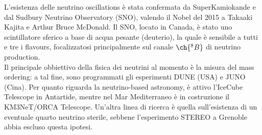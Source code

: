 L'esistenza delle neutrino oscillations è stata confermata da SuperKamiokande e dal Sudbury Neutrino Observatory (SNO), valendo il Nobel del 2015 a Takaaki Kajita e Arthur Bruce McDonald. Il SNO, locato in Canada, è stato uno scintillatore sferico a base di acqua pesante (deuterio), la quale è sensibile a tutti e tre i flavours, focalizzatosi principalmente sul canale $ \ch{^8B} $ di neutrino production.\\
Il principale obbiettivo della fisica dei neutrini al momento è la misura del mass ordering: a tal fine, sono programmati gli esperimenti DUNE (USA) e JUNO (Cina). Per quanto riguarda la neutrino-based astronomy, è attivo l'IceCube Telescope in Antartide, mentre nel Mar Mediterraneo è in costruzione il KM3NeT/ORCA Telescope. Un'altra linea di ricerca è quella sull'esistenza di un eventuale quarto neutrino sterile, sebbene l'esperimento STEREO a Grenoble abbia escluso questa ipotesi.

